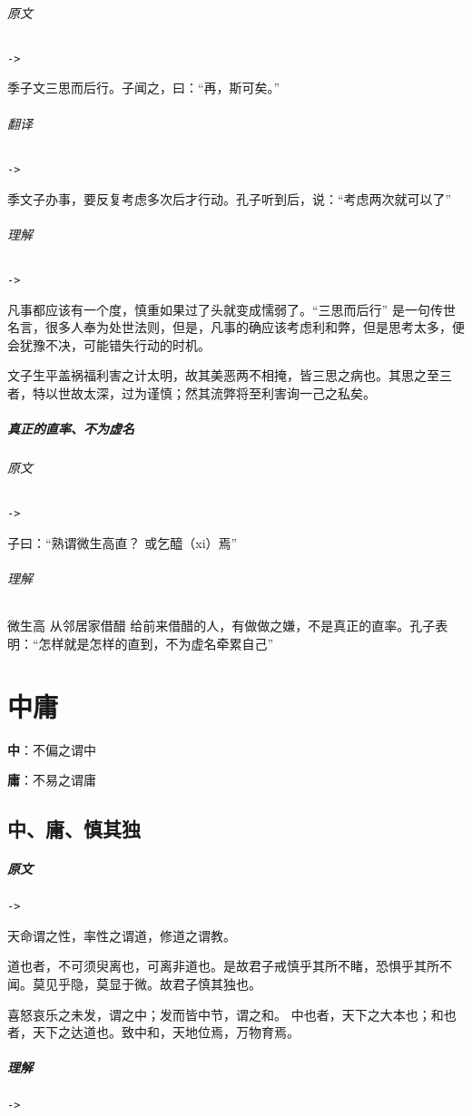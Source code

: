 \documentclass[UTF8,a4paper,8pt]{ctexbook}
\begin{document}
			\subparagraph{原文}\verb|->|
				
				季子文三思而后行。子闻之，曰：“再，斯可矣。”	
				
			\subparagraph{翻译}\verb|->|
				
				季文子办事，要反复考虑多次后才行动。孔子听到后，说：“考虑两次就可以了”	
			
			\subparagraph{理解}\verb|->|
				
				凡事都应该有一个度，慎重如果过了头就变成懦弱了。“三思而后行” 是一句传世名言，很多人奉为处世法则，但是，凡事的确应该考虑利和弊，但是思考太多，便会犹豫不决，可能错失行动的时机。
				
				
				文子生平盖祸福利害之计太明，故其美恶两不相掩，皆三思之病也。其思之至三者，特以世故太深，过为谨慎；然其流弊将至利害询一己之私矣。
				
		\paragraph{真正的直率、不为虚名}
			\subparagraph{原文}\verb|->|
			
				子曰：“熟谓微生高直？ 或乞醯（xi）焉”
				
			\subparagraph{理解}
				微生高 从邻居家借醋 给前来借醋的人，有做做之嫌，不是真正的直率。孔子表明：“怎样就是怎样的直到，不为虚名牵累自己”	
				
		
\chapter{中庸}
	\textbf{中}：不偏之谓中
	
	\textbf{庸}：不易之谓庸
	
	\section{中、庸、慎其独}
		\paragraph{原文}\verb|->|
		
			天命谓之性，率性之谓道，修道之谓教。
			
			道也者，不可须臾离也，可离非道也。是故君子戒慎乎其所不睹，恐惧乎其所不闻。莫见乎隐，莫显于微。故君子慎其独也。
		
			喜怒哀乐之未发，谓之中；发而皆中节，谓之和。 中也者，天下之大本也；和也者，天下之达道也。致中和，天地位焉，万物育焉。
			
		\paragraph{理解}\verb|->|
			
\end{document}

